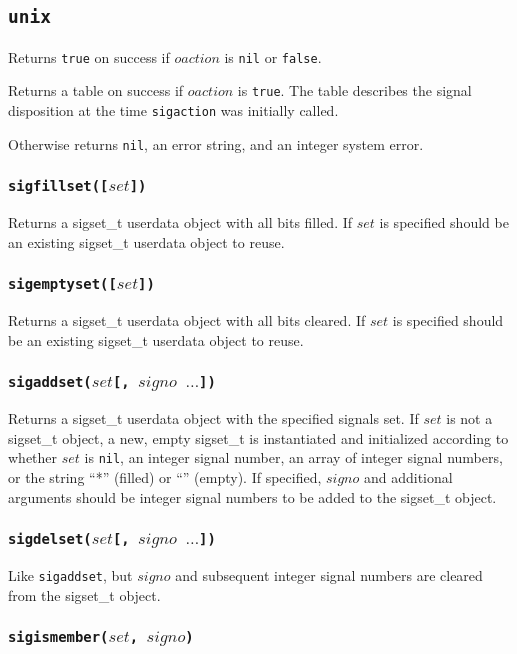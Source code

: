 \documentclass[11pt, oneside]{memoir}
\newcommand*{\true}[0]{\texttt{true}\xspace}
\newcommand*{\false}[0]{\texttt{false}\xspace}
\newcommand*{\nil}[0]{\texttt{nil}\xspace}
\newcommand*{\syscall}[1]{\texttt{#1}\xspace}
\newcommand*{\fn}[1]{\texttt{#1}\xspace}
\newcounter{toccols}
\newenvironment{Module}[1]{
	\subsection{\texttt{#1}}
	\addtocontents{toc}{
		\protect\begin{multicols}{\value{toccols}}
	}
}{
	\addtocontents{toc}{\protect\end{multicols}}
}
\begin{document}
\begin{Module}{unix}
Returns \true on success if $oaction$ is \nil or \false.

Returns a table on success if $oaction$ is \true. The table describes the signal disposition at the time \syscall{sigaction} was initially called.

Otherwise returns \nil, an error string, and an integer system error.

\subsubsection[\fn{sigfillset}]{\fn{sigfillset([$set$])}}

Returns a sigset\_t userdata object with all bits filled. If $set$ is specified should be an existing
sigset\_t userdata object to reuse.

\subsubsection[\fn{sigemptyset}]{\fn{sigemptyset([$set$])}}

Returns a sigset\_t userdata object with all bits cleared. If $set$ is specified should be an existing
sigset\_t userdata object to reuse.

\subsubsection[\fn{sigaddset}]{\fn{sigaddset($set$[, $signo$ $\ldots$])}}

Returns a sigset\_t userdata object with the specified signals set. If $set$ is not a sigset\_t object, a new, empty sigset\_t is instantiated and initialized according to whether $set$ is \nil, an integer signal number, an array of integer signal numbers, or the string ``*'' (filled) or ``'' (empty). If specified, $signo$ and additional arguments should be integer signal numbers to be added to the sigset\_t object.

\subsubsection[\fn{sigdelset}]{\fn{sigdelset($set$[, $signo$ $\ldots$])}}

Like \fn{sigaddset}, but $signo$ and subsequent integer signal numbers are cleared from the sigset\_t object.

\subsubsection[\fn{sigismember}]{\fn{sigismember($set$, $signo$)}}


\end{Module}
\end{document}

